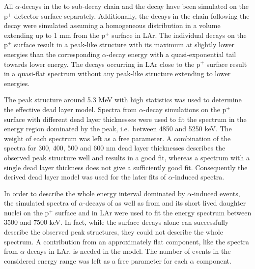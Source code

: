 All $\alpha$-decays in the  to  sub-decay chain and the  decay have been simulated on the p$^+$ detector surface separately. Additionally, the decays in the chain following the  decay were simulated assuming a homogeneous distribution in a volume extending up to 1 mm from the p$^+$ surface in LAr. The individual decays on the p$^+$ surface result in a peak-like structure with its maximum at slightly lower energies than the corresponding $\alpha$-decay energy with a quasi-exponential tail towards lower energy. The decays occurring in LAr close to the p$^+$ surface result in a quasi-flat spectrum without any peak-like structure extending to lower energies.

The  peak structure around 5.3 MeV with high statistics was used to determine the effective dead layer model. Spectra from  $\alpha$-decay simulations on the p$^+$ surface with different dead layer thicknesses were used to fit the spectrum in the energy region dominated by the  peak, i.e.~between 4850 and 5250 keV. The weight of each spectrum was left as a free parameter. A combination of the spectra for 300, 400, 500 and 600 nm dead layer thicknesses describes the observed peak structure well and results in a good fit, whereas a spectrum with a single dead layer thickness does not give a sufficiently good fit. Consequently the derived dead layer model was used for the later fits of $\alpha$-induced spectra.

In order to describe the whole energy interval dominated by $\alpha$-induced events, the simulated spectra of $\alpha$-decays of  as well as from  and its short lived daughter nuclei on the p$^+$ surface and in LAr were used to fit the energy spectrum between 3500 and 7500 keV. In fact, while the surface decays alone can successfully describe the observed peak structures, they could not describe the whole spectrum. A contribution from an approximately flat component, like the spectra from $\alpha$-decays in LAr, is needed in the model. The number of events in the considered energy range was left as a free parameter for each $\alpha$ component.


